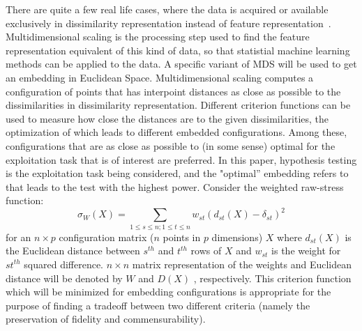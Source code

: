 \documentclass[11pt]{article} %
\begin{document}
There are quite  a few real life cases, where the data is acquired or available exclusively in dissimilarity representation instead of feature representation~\cite{CMDS,borg+groenen:1997,duin2005dissimilarity}.
 Multidimensional scaling is the processing step used to find the feature representation equivalent of this kind of data, so that  statistial machine learning methods can be applied to the data. A specific variant of MDS will be used to get an embedding in  Euclidean Space. Multidimensional scaling computes a configuration of points that has interpoint distances as close as possible to the dissimilarities in dissimilarity representation. Different criterion functions can be used to measure how close the distances are  to the given dissimilarities, the optimization of which leads to different embedded configurations. Among these, configurations  that are  as close as possible to (in some sense) optimal for the exploitation task that is of interest are preferred. In this paper, hypothesis testing is the exploitation task being considered, and   the "optimal'' embedding  refers to  that leads to the  test with  the highest power. Consider the weighted raw-stress function:
\begin{equation}
\sigma_{W}(X)=\sum_{1\leq s\leq n;1\leq t\leq n} {w_{st}(d_{st}(X)-\delta_{st})^2  }\label{raw-stress}
\end{equation}
 for an  $n \times p$ configuration matrix ($n$ points in $p$ dimensions)  $X$  where $d_{st}(X)$ is the Euclidean distance between $s^{th}$ and $t^{th}$ rows of $X$ and $w_{st}$ is the weight for $st^{th}$  squared difference.  $n \times n$  matrix representation of the weights and Euclidean distance will be denoted by $W$ and $D(X)$  , respectively. This   criterion function which will be minimized for embedding configurations is appropriate for the purpose of finding a tradeoff between two different criteria (namely the preservation of fidelity and commensurability).
\end{document}
